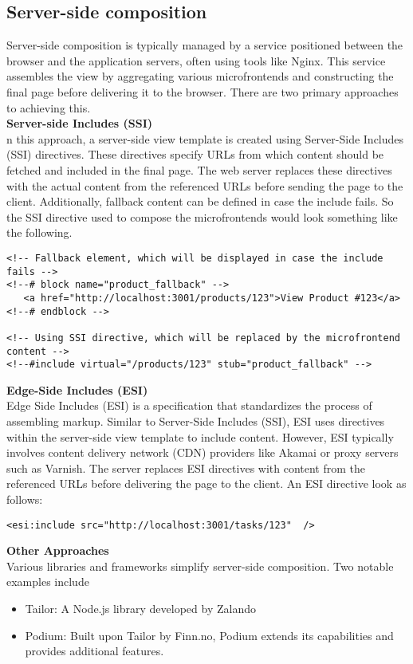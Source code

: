 \subsection{Server-side composition}
Server-side composition is typically managed by a service positioned between the browser and the application servers, often using tools like Nginx. This service assembles the view by aggregating various microfrontends and constructing the final page before delivering it to the browser. There are two primary approaches to achieving this.\\

\noindent
\textbf{Server-side Includes (SSI)}\\
n this approach, a server-side view template is created using Server-Side Includes (SSI) directives. These directives specify URLs from which content should be fetched and included in the final page. The web server replaces these directives with the actual content from the referenced URLs before sending the page to the client. Additionally, fallback content can be defined in case the include fails. So the SSI directive used to compose the microfrontends would look something like the following.
\begin{verbatim}
<!-- Fallback element, which will be displayed in case the include
fails -->
<!--# block name="product_fallback" -->
   <a href="http://localhost:3001/products/123">View Product #123</a>
<!--# endblock -->

<!-- Using SSI directive, which will be replaced by the microfrontend
content -->
<!--#include virtual="/products/123" stub="product_fallback" -->
\end{verbatim}

\noindent
\textbf{Edge-Side Includes (ESI)}\\
Edge Side Includes (ESI) is a specification that standardizes the process of assembling markup. Similar to Server-Side Includes (SSI), ESI uses directives within the server-side view template to include content. However, ESI typically involves content delivery network (CDN) providers like Akamai or proxy servers such as Varnish. The server replaces ESI directives with content from the referenced URLs before delivering the page to the client. An ESI directive look as follows:
\begin{verbatim}
<esi:include src="http://localhost:3001/tasks/123"  />
\end{verbatim}

\noindent
\textbf{Other Approaches}\\
Various libraries and frameworks simplify server-side composition. Two notable examples include
\begin{itemize}
   \item Tailor: A Node.js library developed by Zalando
   \item Podium: Built upon Tailor by Finn.no, Podium extends its capabilities and provides additional features. \cite{Geers}
\end{itemize}

